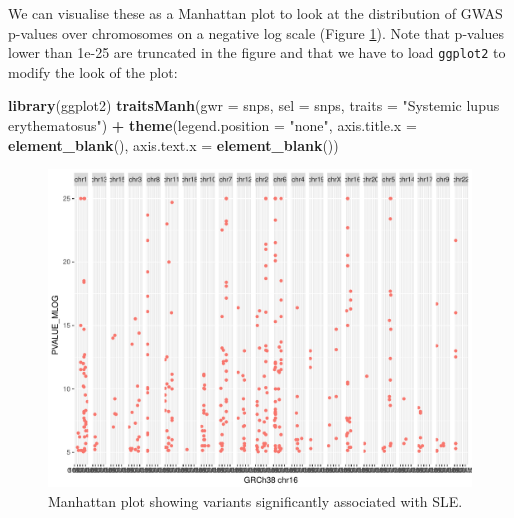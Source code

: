 \documentclass[9pt,a4paper,]{extarticle}
\newenvironment{Shaded}{\begin{snugshade}}{\end{snugshade}}
\newcommand{\KeywordTok}[1]{\textcolor[rgb]{0.13,0.29,0.53}{\textbf{#1}}}
\newcommand{\DataTypeTok}[1]{\textcolor[rgb]{0.13,0.29,0.53}{#1}}
\newcommand{\StringTok}[1]{\textcolor[rgb]{0.31,0.60,0.02}{#1}}
\newcommand{\OperatorTok}[1]{\textcolor[rgb]{0.81,0.36,0.00}{\textbf{#1}}}
\newcommand{\NormalTok}[1]{#1}
\begin{document}
We can visualise these as a Manhattan plot to look at the distribution of GWAS p-values over chromosomes on a negative log scale (Figure \ref{fig:manhattan}).
Note that p-values lower than 1e-25 are truncated in the figure and that we have to load \texttt{ggplot2} \citep{Wickham2009} to modify the look of the plot:

\begin{Shaded}
\begin{Highlighting}[]
\KeywordTok{library}\NormalTok{(ggplot2)}
\KeywordTok{traitsManh}\NormalTok{(}\DataTypeTok{gwr =}\NormalTok{ snps, }\DataTypeTok{sel =}\NormalTok{ snps, }\DataTypeTok{traits =} \StringTok{"Systemic lupus erythematosus"}\NormalTok{) }\OperatorTok{+}
\StringTok{  }\KeywordTok{theme}\NormalTok{(}\DataTypeTok{legend.position =} \StringTok{"none"}\NormalTok{,}
        \DataTypeTok{axis.title.x =} \KeywordTok{element_blank}\NormalTok{(),}
        \DataTypeTok{axis.text.x =} \KeywordTok{element_blank}\NormalTok{())}
\end{Highlighting}
\end{Shaded}

\begin{figure}

{\centering \includegraphics{biocondutor-regulatory-genomics-workflow_files/figure-latex/manhattan-1} 

}

\caption{Manhattan plot showing variants significantly associated with SLE.}\label{fig:manhattan}
\end{figure}
\end{document}
